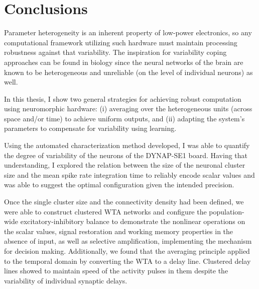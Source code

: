 \chapter{Conclusions}
\label{ch:conclusions}

Parameter heterogeneity is an inherent property of low-power electronics, so any computational framework utilizing such hardware must maintain processing robustness against that variability. The inspiration for variability coping approaches can be found in biology since the neural networks of the brain are known to be heterogeneous and unreliable (on the level of individual neurons) as well. 

In this thesis, I show two general strategies for achieving robust computation using neuromorphic hardware: (i) averaging over the heterogeneous units (across space and/or time) to achieve uniform outputs, and (ii) adapting the system's parameters to compensate for variability using learning.

Using the automated characterization method developed, I was able to quantify the degree of variability of the neurons of the DYNAP-SE1 board. Having that understanding, I explored the relation between the size of the neuronal cluster size and the mean spike rate integration time to reliably encode scalar values and was able to suggest the optimal configuration given the intended precision.


Once the single cluster size and the connectivity density had been defined, we were able to construct clustered \ac{WTA} networks and configure the population-wide excitatory-inhibitory balance to demonstrate the nonlinear operations on the scalar values, signal restoration and working memory properties in the absence of input, as well as selective amplification, implementing the mechanism for decision making. Additionally, we found that the averaging principle applied to the temporal domain by converting the WTA to a delay line. Clustered delay lines showed to maintain speed of the activity pulses in them despite the variability of individual synaptic delays.

